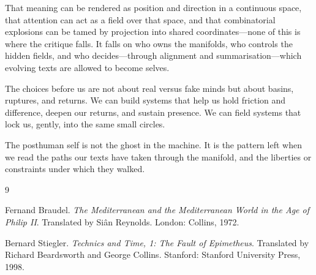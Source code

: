 \documentclass[12pt,a4paper]{article}
\begin{document}
That meaning can be rendered as position and direction in a continuous space, that attention can act as a field over that space, and that combinatorial explosions can be tamed by projection into shared coordinates---none of this is where the critique falls. It falls on who owns the manifolds, who controls the hidden fields, and who decides---through alignment and summarisation---which evolving texts are allowed to become selves.

The choices before us are not about real versus fake minds but about basins, ruptures, and returns. We can build systems that help us hold friction and difference, deepen our returns, and sustain presence. We can field systems that lock us, gently, into the same small circles.

The posthuman self is not the ghost in the machine. It is the pattern left when we read the paths our texts have taken through the manifold, and the liberties or constraints under which they walked.


\begin{thebibliography}{9}

Fernand Braudel.
\newblock \emph{The Mediterranean and the Mediterranean World in the Age of Philip II}.
\newblock Translated by Si\^{a}n Reynolds. London: Collins, 1972.

Bernard Stiegler.
\newblock \emph{Technics and Time, 1: The Fault of Epimetheus}.
\newblock Translated by Richard Beardsworth and George Collins. Stanford: Stanford University Press, 1998.

\end{thebibliography}
\end{document}
